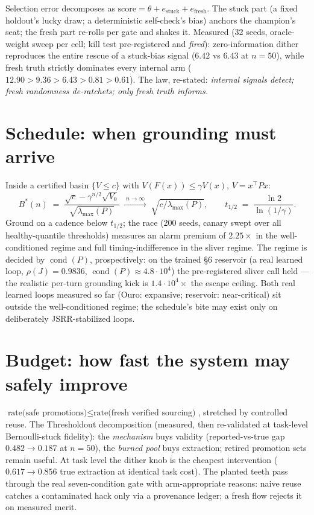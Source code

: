 \documentclass[11pt]{article}
\DeclareMathOperator{\cond}{cond}
\begin{document}
Selection error decomposes as $\text{score} = \theta + e_{\text{stuck}} + e_{\text{fresh}}$.
The stuck part (a fixed holdout's lucky draw; a deterministic self-check's bias) anchors the
champion's seat; the fresh part re-rolls per gate and shakes it. Measured (32 seeds,
oracle-weight sweep per cell; kill test pre-registered and \emph{fired}):
zero-information dither reproduces the entire rescue of a stuck-bias signal
($6.42$ vs $6.43$ at $n{=}50$), while fresh truth strictly dominates every internal arm
($12.90 > 9.36 > 6.43 > 0.81 > 0.61$). The law, re-stated:
\emph{internal signals detect; fresh randomness de-ratchets; only fresh truth informs.}

\section{Schedule: when grounding must arrive}

Inside a certified basin $\{V \le c\}$ with $V(F(x)) \le \gamma V(x)$, $V = x^\top P x$:
\[
B^*(n) \;=\; \frac{\sqrt{c} - \gamma^{n/2}\sqrt{V_0}}{\sqrt{\lambda_{\max}(P)}}
\;\xrightarrow{\;n\to\infty\;}\; \sqrt{c/\lambda_{\max}(P)},
\qquad
t_{1/2} \;=\; \frac{\ln 2}{\ln(1/\gamma)} .
\]
Ground on a cadence below $t_{1/2}$; the race (200 seeds, canary swept over all
healthy-quantile thresholds) measures an alarm premium of $2.25\times$ in the
well-conditioned regime and full timing-indifference in the sliver regime. The regime is
decided by $\cond(P)$, prospectively: on the trained \S6 reservoir (a real learned loop,
$\rho(J){=}0.9836$, $\cond(P){\approx}4.8{\cdot}10^4$) the pre-registered sliver call held
--- the realistic per-turn grounding kick is $1.4{\cdot}10^4\times$ the escape ceiling.
Both real learned loops measured so far (Ouro: expansive; reservoir: near-critical) sit
outside the well-conditioned regime; the schedule's bite may exist only on deliberately
JSRR-stabilized loops.

\section{Budget: how fast the system may safely improve}

$\text{rate(safe promotions)} \le \text{rate(fresh verified sourcing)}$, stretched by
controlled reuse. The Thresholdout decomposition (measured, then re-validated at task-level
Bernoulli-stuck fidelity): the \emph{mechanism} buys validity (reported-vs-true gap
$0.482 \to 0.187$ at $n{=}50$), the \emph{burned pool} buys extraction; retired promotion
sets remain useful. At task level the dither knob is the cheapest intervention
($0.617 \to 0.856$ true extraction at identical task cost). The planted teeth pass through
the real seven-condition gate with arm-appropriate reasons: naive reuse catches a
contaminated hack only via a provenance ledger; a fresh flow rejects it on measured merit.
\end{document}
